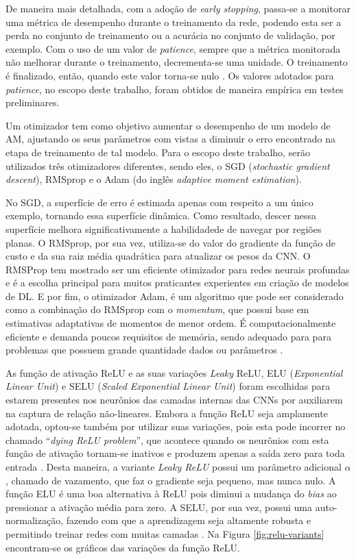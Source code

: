 De maneira mais detalhada, com a adoção de \emph{early stopping}, passa-se a monitorar uma métrica de desempenho durante o treinamento da rede, podendo esta ser a perda no conjunto de treinamento ou a acurácia no conjunto de validação, por exemplo. Com o uso de um valor de \emph{patience}, sempre que a métrica monitorada não melhorar durante o treinamento, decrementa-se uma unidade. O treinamento é finalizado, então, quando este valor torna-se nulo \cite{chollet}. Os valores adotados para \emph{patience}, no escopo deste trabalho, foram obtidos de maneira empírica em testes preliminares.

Um otimizador tem como objetivo aumentar o desempenho de um modelo de AM, ajustando os seus parâmetros com vistas a diminuir o erro encontrado na etapa de treinamento de tal modelo. Para o escopo deste trabalho, serão utilizados três otimizadores diferentes, sendo eles, o SGD (\emph{stochastic gradient descent}), RMSprop e o Adam (do inglês \emph{adaptive moment estimation}).

No SGD, a superfície de erro é estimada apenas com respeito a um único exemplo, tornando essa superfície dinâmica. Como resultado, descer nessa superfície melhora significativamente a habilidadede de navegar por regiões planas. O RMSprop, por sua vez, utiliza-se do valor do gradiente da função de custo e da sua raiz média quadrática para atualizar os pesos da CNN. O RMSProp tem mostrado ser um eficiente otimizador para redes neurais profundas e é a escolha principal para muitos praticantes experientes em criação de modelos de DL. E por fim, o otimizador Adam, é um algoritmo que pode ser considerado como a combinação do RMSprop com o \emph{momentum}, que possui base em estimativas adaptativas de momentos de menor ordem. É computacionalmente eficiente e demanda poucos requisitos de memória, sendo adequado para para problemas que possuem grande quantidade dados ou parâmetros \cite{buduma, rmsprop, adam}.

As função de ativação ReLU e as suas variações \emph{Leaky} ReLU, ELU (\emph{Exponential Linear Unit}) e SELU (\emph{Scaled Exponential Linear Unit}) foram escolhidas para estarem presentes nos neurônios das camadas internas das CNNs por auxiliarem na captura de relação não-lineares. Embora a função ReLU seja amplamente adotada, optou-se também por utilizar suas variações, pois esta pode incorrer no chamado ``\emph{dying ReLU problem}'', que acontece quando os neurônios com esta função de ativação tornam-se inativos e produzem apenas a saída zero para toda entrada \cite{reluDying}.  Desta maneira, a variante \emph{Leaky ReLU} possui um parâmetro adicional $\alpha$, chamado de vazamento, que faz o gradiente seja pequeno, mas nunca nulo. A função ELU é uma boa alternativa à ReLU pois diminui a mudança do \emph{bias} ao pressionar a ativação média para zero. A SELU, por sua vez, possui uma auto-normalização, fazendo com que a aprendizagem seja altamente robusta e permitindo treinar redes com muitas camadas \cite{relu}. Na Figura \ref{fig:relu-variants} encontram-se os gráficos das variações da função ReLU.

